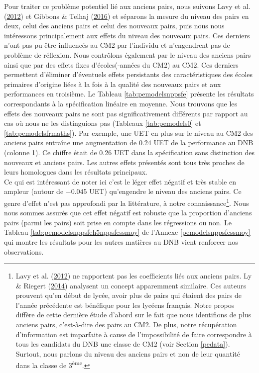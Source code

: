 \documentclass[
]{book}
\begin{document}
Pour traiter ce problème potentiel lié aux anciens pairs, nous suivons Lavy et al. (\protect\hyperlink{ref-LAV:eal:12}{2012}) et Gibbons \& Telhaj (\protect\hyperlink{ref-GIB:TEL:16}{2016}) et séparons la mesure du niveau des pairs en deux, celui des anciens pairs et celui des nouveaux pairs, puis nous nous intéressons principalement aux effets du niveau des nouveaux pairs. Ces derniers n'ont pas pu être influencés au CM2 par l'individu et n'engendrent pas de problème de réflexion. Nous contrôlons également par le niveau des anciens pairs ainsi que par des effets fixes d'écoles(-années du CM2) au CM2. Ces derniers permettent d'éliminer d'éventuels effets persistants des caractéristiques des écoles primaires d'origine liées à la fois à la qualité des nouveaux pairs et aux performances en troisième.
Le Tableau \ref{tab:pemodelsnppsfe} présente les résultats correspondants à la spécification linéaire en moyenne. Nous trouvons que les effets des nouveaux pairs ne sont pas significativement différents par rapport au cas où nous ne les distinguions pas (Tableaux \ref{tab:pemodels0} et \ref{tab:pemodelsfrmaths}). Par exemple, une UET en plus sur le niveau au CM2 des anciens pairs entraîne une augmentation de 0.24 UET de la performance au DNB (colonne 1). Ce chiffre était de 0.26 UET dans la spécification sans distinction des nouveaux et anciens pairs. Les autres effets présentés sont tous très proches de leurs homologues dans les résultats principaux.\\
Ce qui est intéressant de noter ici c'est le léger effet négatif et très stable en ampleur (autour de \(- 0.045\) UET) qu'engendre le niveau des anciens pairs. Ce genre d'effet n'est pas approfondi par la littérature, à notre connaissance\footnote{Lavy et al. (\protect\hyperlink{ref-LAV:eal:12}{2012}) ne rapportent pas les coefficients liés aux anciens pairs. Ly \& Riegert (\protect\hyperlink{ref-LY:RIE:14}{2014}) analysent un concept apparemment similaire. Ces auteurs prouvent qu'en début de lycée, avoir plus de pairs qui étaient des pairs de l'année précédente est bénéfique pour les lycéens français. Notre propos diffère de cette dernière étude d'abord sur le fait que nous identifions de plus anciens pairs, c'est-à-dire des pairs au CM2. De plus, notre récupération d'information est imparfaite à cause de l'impossibilité de faire correspondre à tous les candidats du DNB une classe de CM2 (voir Section \ref{pedata}). Surtout, nous parlons du niveau des anciens pairs et non de leur quantité dans la classe de 3\textsuperscript{ème}.}. Nous nous sommes assurés que cet effet négatif est robuste que la proportion d'anciens pairs (parmi les pairs) soit prise en compte dans les régressions ou non. Le Tableau \ref{tab:pemodelsnppsfeh5nppsfessmoy} de l'Annexe \ref{pemodelsnppsfessmoy} qui montre les résultats pour les autres matières au DNB vient renforcer nos observations.
\end{document}
